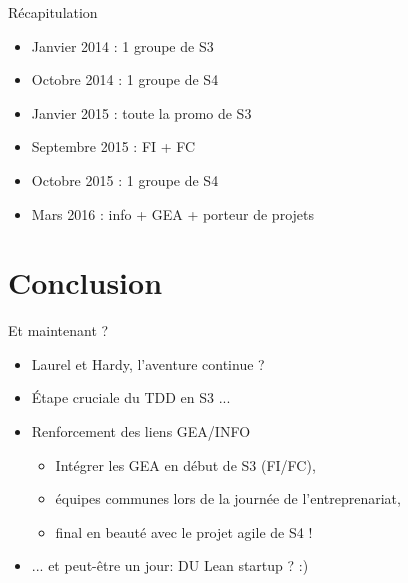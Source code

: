 \documentclass{beamer}
\begin{document}
\begin{frame}{Récapitulation}
  \begin{itemize}
    \item Janvier 2014 : 1 groupe de S3
    \item Octobre 2014 : 1 groupe de S4
    \item Janvier 2015 : toute la promo de S3
    \item Septembre 2015 : FI + FC
    \item Octobre 2015 : 1 groupe de S4
    \item Mars 2016 : info + GEA + porteur de projets
  \end{itemize}
\end{frame}

\section{Conclusion}
\begin{frame}{Et maintenant ?}
  \begin{itemize}
    \item Laurel et Hardy, l'aventure continue ?
    \item Étape cruciale du TDD en S3 ...
    \item Renforcement des liens GEA/INFO
      \begin{itemize}
        \item Intégrer les GEA en début de S3 (FI/FC),
        \item équipes communes lors de la journée de l'entreprenariat,
        \item final en beauté avec le projet agile de S4 !
      \end{itemize}
    \item ... et peut-être un jour: DU Lean startup ? :)
  \end{itemize}
\end{frame}
\end{document}
